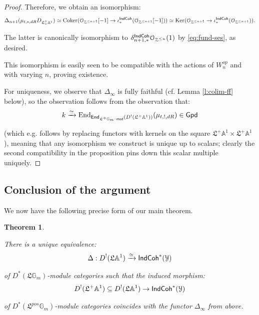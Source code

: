 \documentclass[reqno,11pt]{amsart}
\numberwithin{equation}{subsection}
\newtheorem{thm}{Theorem}[subsubsection]
\theoremstyle{remark}
\newcommand{\xar}[1]{\xrightarrow{#1}}
\newcommand{\rar}[1]{\xar{#1}}
\newcommand{\isom}{\rar{\simeq}}
\newcommand{\bA}{{\mathbb A}}
\newcommand{\bG}{{\mathbb G}}
\newcommand{\sO}{{\EuScript O}}
\newcommand{\sY}{{\EuScript Y}}
\newcommand{\sZ}{{\EuScript Z}}
\newcommand{\fL}{{\mathfrak L}}
\newcommand{\on}{\operatorname}
\newcommand{\mathendash}{\text{\textendash}}
\newcommand{\Ker}{\on{Ker}}
\newcommand{\Coker}{\on{Coker}}
\newcommand{\End}{\on{End}}
\renewcommand{\mod}{\mathendash\mathsf{mod}}
\newcommand{\Gpd}{\mathsf{Gpd}}
\newcommand{\TwoEnd}{\mathsf{End}}
\newcommand{\IndCoh}{\mathsf{IndCoh}}
\renewcommand{\subset}{\subseteq}
\begin{document}
\begin{proof}
Therefore, we obtain an isomorphism:
%
\[
\Delta_{n+1}(\mu_{t,*,dR} D_{\fL_n^+\bA^1}) \simeq 
\Coker(\sO_{\sZ^{\leq n+1}}[-1] \to \iota_*^{\IndCoh}(\sO_{\sZ^{\leq n+1}}[-1])) 
\simeq 
\Ker(\sO_{\sZ^{\leq n+1}} \to \iota_*^{\IndCoh}(\sO_{\sZ^{\leq n+1}})).
\]

\noindent The latter is canonically isomorphism to 
$\delta_{n+1,*}^{\IndCoh}\sO_{\sZ^{\leq n}}(1)$ by \eqref{eq:fund-ses}, 
as desired.

This isomorphism is easily seen to be compatible with the actions of $W_n^{op}$ 
and with varying $n$, proving existence.

For uniqueness, we observe that $\Delta_{\infty}$ is fully faithful
(cf. Lemma \ref{l:colim-ff} below), so the observation follows from the 
observation that:
%
\[
k \isom \End_{\TwoEnd_{\fL^+\bG_m\mod}(D^!(\fL^+\bA^1))}(\mu_{t,!,dR}) \in \Gpd
\]

\noindent (which e.g. follows by replacing functors with kernels
on the square $\fL^+\bA^1 \times \fL^+\bA^1$), 
meaning that any isomorphism we construct is unique up to scalars;
clearly the second compatibility in the proposition pins down this
scalar multiple uniquely.

\end{proof}

\subsection{Conclusion of the argument}

We now have the following precise form of our main theorem.

\begin{thm}\label{t:main-precise}

There is a unique equivalence:
%
\[
\Delta:D^!(\fL\bA^1) \isom  \IndCoh^*(\sY) 
\]

\noindent of $D^*(\fL\bG_m)$-module categories such that the induced morphism:
%
\[
D^!(\fL^+\bA^1) \subset D^!(\fL\bA^1) \to \IndCoh^*(\sY) 
\]

\noindent of $D^*(\fL^{pos}\bG_m)$-module categories coincides with the functor
$\Delta_{\infty}$ from above.

\end{thm}
\end{document}
